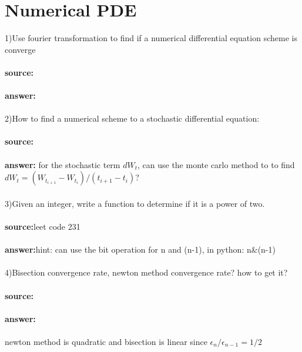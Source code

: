 \documentclass[11pt,fleqn]{book} %
\begin{document}
\section{Numerical PDE}

1)Use fourier transformation to find if a numerical differential equation scheme is converge \\\\
\textbf{source:} \\\\
\textbf{answer:} \\\\
2)How to find a numerical scheme to a stochastic differential equation: \\\\
\textbf{source:} \\\\
\textbf{answer:} for the stochastic term $dW_t$, can use the monte carlo method to to find $dW_t=(W_{t_{i+1}}-W_{t_i})/(t_{i+1}-t_i)$?\\\\
3)Given an integer, write a function to determine if it is a power of two.\\\\
\textbf{source:}leet code 231 \\\\
\textbf{answer:}hint: can use the bit operation for n and (n-1), in python: n\&(n-1) \\\\
4)Bisection convergence rate, newton method convergence rate? how to get it? \\\\
\textbf{source:} \\\\
\textbf{answer:} \\\\
newton method is quadratic and bisection is linear since $\epsilon_n/\epsilon_{n-1}=1/2$
\end{document}
